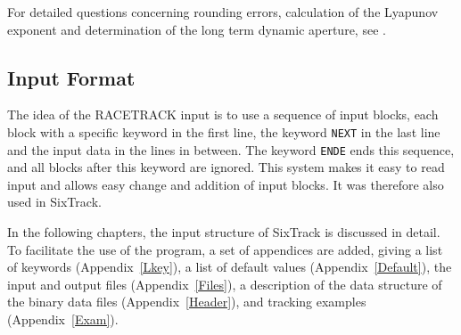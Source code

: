 For detailed questions concerning rounding errors, calculation of the Lyapunov exponent and determination of the long term dynamic aperture, see \cite{thesis}.

\subsection{Input Format}

The idea of the RACETRACK input is to use a sequence of input blocks, each block with a specific keyword in the first line, the keyword \texttt{NEXT} in the last line and the input data in the lines in between.
The keyword \texttt{ENDE} ends this sequence, and all blocks after this keyword are ignored.
This system makes it easy to read input and allows easy change and addition of input blocks. It was therefore also used in SixTrack\@.

In the following chapters, the input structure of SixTrack is discussed in detail.
To facilitate the use of the program, a set of appendices are added, giving a list of keywords \mbox{(Appendix~\ref{Lkey}),} a list of default values \mbox{(Appendix~\ref{Default}),} the input and output files \mbox{(Appendix~\ref{Files}),} a description of the data structure of the binary data files \mbox{(Appendix~\ref{Header}),} and tracking examples \mbox{(Appendix~\ref{Exam}).}
